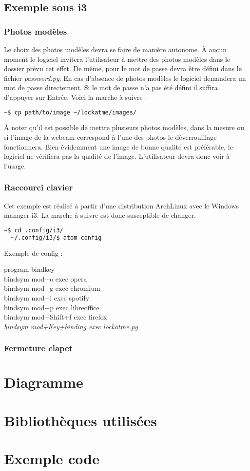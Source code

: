   \subsection{Exemple sous i3}
    \subsubsection{Photos modèles}
Le choix des photos modèles devra se faire de manière autonome. À aucun moment
le logiciel invitera l'utilisateur à mettre des photos modèles dans le dossier
prévu cet effet. De même, pour le mot de passe devra être défini dans le
fichier \emph{password.py}. En cas d'absence de photos
modèles le logiciel demandera un mot de passe directement. Si le mot de passe
n'a pas été défini il suffira d'appuyer sur Entrée.
Voici la marche à suivre :
\begin{lstlisting}[language=bash]
  ~$ cp path/to/image ~/lockatme/images/
\end{lstlisting}
À noter qu'il est possible de mettre plusieurs photos modèles, dans la mesure
ou si l'image de la webcam correspond à l'une des photos le déverrouillage
fonctionnera.
\vspace{0.5cm}
Bien évidemment une image de bonne qualité est préférable, le logiciel ne
vérifiera pas la qualité de l'image. L'utilisateur devra donc voir à l'usage.

    \subsubsection{Raccourci clavier}
Cet exemple est réalisé à partir d'une distribution ArchLinux avec le Windows
manager i3. La marche à suivre est donc susceptible de changer.
\begin{lstlisting}[language=bash]
  ~$ cd .config/i3/
  ~/.config/i3/$ atom config
\end{lstlisting}
Exemple de config :
\begin{tcolorbox}[enhanced,width=5in,center upper,
    fontupper=\large\bfseries,drop fuzzy shadow southwest,
    boxrule=0.4pt,sharp corners,colframe=yellow!80!black,colback=yellow!10]
    program bindkey\\
    bindsym mod+o exec opera\\
    bindsym mod+g exec chromium\\
    bindsym mod+i exec spotify\\
    bindsym mod+p exec libreoffice\\
    bindsym mod+Shift+f exec firefox\\
    \emph{bindsym mod+Key+binding exec lockatme.py}
\end{tcolorbox}
    \subsubsection{Fermeture clapet}

\section{Diagramme}
\section{Bibliothèques utilisées}
\section{Exemple code}

